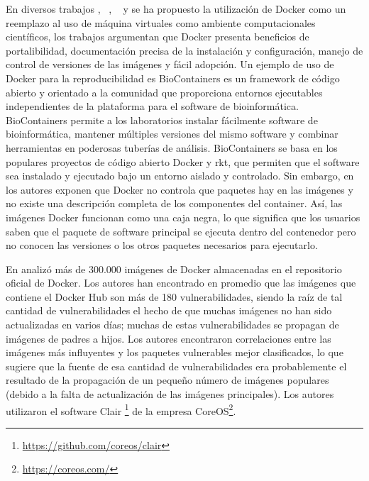 En diversos trabajos \cite{DBLP:journals/bioinformatics/LeprevostGARUBV17}, ~\cite{Beaulieu2017}, ~\cite{Boettiger:2015:IDR:2723872.2723882} y \cite{aranguren2015enhanced} se ha propuesto la utilización de Docker como un reemplazo al uso de máquina virtuales como ambiente computacionales científicos, los trabajos argumentan que Docker presenta beneficios de portalibilidad, documentación precisa de la instalación y configuración, manejo de control de versiones de las imágenes y fácil adopción. 
Un ejemplo de uso de Docker para la reproducibilidad es BioContainers \cite{DBLP:journals/bioinformatics/LeprevostGARUBV17} es un framework de código abierto y orientado a la comunidad que proporciona entornos ejecutables independientes de la plataforma para el software de bioinformática. BioContainers permite a los laboratorios instalar fácilmente software de bioinformática, mantener múltiples versiones del mismo software y combinar herramientas en poderosas tuberías de análisis. BioContainers se basa en los populares proyectos de código abierto Docker y rkt, que permiten que el software sea instalado y ejecutado bajo un entorno aislado y controlado.
Sin embargo, en \cite{Boettiger:2015:IDR:2723872.2723882,DBLP:conf/semweb/OsorioAV18} los autores exponen que Docker no controla que paquetes hay en las imágenes y no existe una descripción completa de los componentes del container. Así, las imágenes Docker funcionan como una caja negra, lo que significa que los usuarios saben que el paquete de software principal se ejecuta dentro del contenedor pero no conocen las versiones o los otros paquetes necesarios para ejecutarlo.

En \cite{Shu:2017:SSV:3029806.3029832:DockerHub:Security} analizó más de 300.000 imágenes de Docker almacenadas en el repositorio oficial de Docker. Los autores han encontrado en promedio que las imágenes que contiene el Docker Hub son más de 180 vulnerabilidades, siendo la raíz de tal cantidad de vulnerabilidades el hecho de que muchas imágenes no han sido actualizadas en varios días; muchas de estas vulnerabilidades se propagan de imágenes de padres a hijos. Los autores encontraron correlaciones entre las imágenes más influyentes y los paquetes vulnerables mejor clasificados, lo que sugiere que la fuente de esa cantidad de vulnerabilidades era probablemente el resultado de la propagación de un pequeño número de imágenes populares (debido a la falta de actualización de las imágenes principales). Los autores utilizaron el software Clair \footnote{\url{https://github.com/coreos/clair}} de la empresa CoreOS\footnote{\url{https://coreos.com/}}. 


